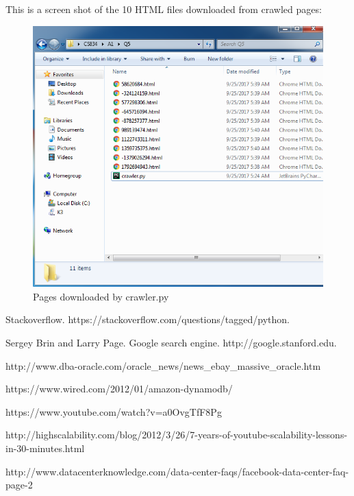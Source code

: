 \documentclass[a4paper, 11pt]{article}
\begin{document}
\pagebreak

This is a screen shot of the 10 HTML files downloaded from crawled pages:

\begin{figure}[h]
\caption{Pages downloaded by crawler.py}
\centering
\includegraphics[scale=0.7]{Q5/files.png}
\end{figure}

\begin{thebibliography}{9}

\bibitem{} 
Stackoverflow. https://stackoverflow.com/questions/tagged/python.

\bibitem{} 
Sergey Brin and Larry Page. Google search engine. http://google.stanford.edu.

\bibitem{}
http://www.dba-oracle.com/oracle\_news/news\_ebay\_massive\_oracle.htm

\bibitem{}
https://www.wired.com/2012/01/amazon-dynamodb/

\bibitem{}
https://www.youtube.com/watch?v=a0OvgTfF8Pg

\bibitem{}
http://highscalability.com/blog/2012/3/26/7-years-of-youtube-scalability-lessons-in-30-minutes.html

\bibitem{} http://www.datacenterknowledge.com/data-center-faqs/facebook-data-center-faq-page-2


\end{thebibliography}
\end{document}
